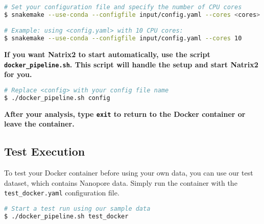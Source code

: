\documentclass[a4paper,11pt]{article}
\newcommand{\vsp}{\vspace{0.2cm}}
\begin{document}
\begin{lstlisting}[language=bash]
# Set your configuration file and specify the number of CPU cores
$ snakemake --use-conda --configfile input/config.yaml --cores <cores>

# Example: using <config.yaml> with 10 CPU cores:
$ snakemake --use-conda --configfile input/config.yaml --cores 10
\end{lstlisting}
\vsp

\noindent
\textbf{If you want Natrix2 to start automatically, use the script \texttt{docker\_pipeline.sh}. This script will handle the setup and start Natrix2 for you.}

\begin{lstlisting}[language=bash]
# Replace <config> with your config file name
$ ./docker_pipeline.sh config
\end{lstlisting}

\vsp
\noindent
\textbf{After your analysis, type \texttt{exit} to return to the Docker container or leave the container.}	

\subsection{Test Execution}
To test your Docker container before using your own data, you can use our test dataset, which contains Nanopore data. Simply run the container with the \texttt{test\_docker.yaml} configuration file.

\begin{lstlisting}[language=bash]
# Start a test run using our sample data
$ ./docker_pipeline.sh test_docker
\end{lstlisting}
\end{document}
